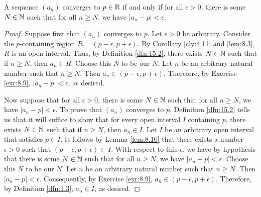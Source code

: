 \documentclass[../main.tex]{subfiles}
\begin{document}
\begin{theorem}\label{trm:15.7}
    A sequence $(a_n)$ converges to $p\in\mathbb{R}$ if and only if for all $\epsilon>0$, there is some $N\in\mathbb{N}$ such that for all $n\geq N$, we have $|a_n-p|<\epsilon$.
    \begin{proof}
        Suppose first that $(a_n)$ converges to $p$. Let $\epsilon>0$ be arbitrary. Consider the $p$-containing region $R=(p-\epsilon,p+\epsilon)$. By Corollary \ref{cly:4.11} and \ref{lem:8.3}, $R$ is an open interval. Thus, by Definition \ref{dfn:15.2}, there exists $N\in\mathbb{N}$ such that if $n\geq N$, then $a_n\in R$. Choose this $N$ to be our $N$. Let $n$ be an arbitrary natural number such that $n\geq N$. Then $a_n\in(p-\epsilon,p+\epsilon)$. Therefore, by Exercise \ref{exr:8.9}, $|a_n-p|<\epsilon$, as desired.\par
        Now suppose that for all $\epsilon>0$, there is some $N\in\mathbb{N}$ such that for all $n\geq N$, we have $|a_n-p|<\epsilon$. To prove that $(a_n)$ converges to $p$, Definition \ref{dfn:15.2} tells us that it will suffice to show that for every open interval $I$ containing $p$, there exists $N\in\mathbb{N}$ such that if $n\geq N$, then $a_n\in I$. Let $I$ be an arbitrary open interval that satisfies $p\in I$. It follows by Lemma \ref{lem:8.10} that there exists a number $\epsilon>0$ such that $(p-\epsilon,p+\epsilon)\subset I$. With respect to this $\epsilon$, we have by hypothesis that there is some $N\in\mathbb{N}$ such that for all $n\geq N$, we have $|a_n-p|<\epsilon$. Choose this $N$ to be our $N$. Let $n$ be an arbitrary natural number such that $n\geq N$. Then $|a_n-p|<\epsilon$. Consequently, by Exercise \ref{exr:8.9}, $a_n\in(p-\epsilon,p+\epsilon)$. Therefore, by Definition \ref{dfn:1.3}, $a_n\in I$, as desired.
    \end{proof}
\end{theorem}
\end{document}
